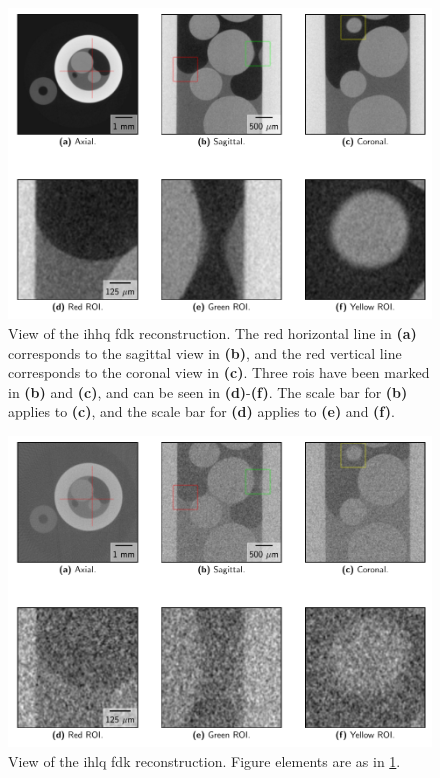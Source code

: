 
\begin{figure}[htbp]
  \centering
  \includegraphics[width=.9\textwidth]{figures/kimroberthq-x475y620s250.pdf}
  \caption[View of IHHQ]{View of the \gls{ihhq} \gls{fdk} reconstruction. The red horizontal line in \textbf{(a)} corresponds to the sagittal view in \textbf{(b)}, and the red vertical line corresponds to the coronal view in \textbf{(c)}. Three \gls{roi}s have been marked in \textbf{(b)} and \textbf{(c)}, and can be seen in \textbf{(d)}-\textbf{(f)}. The scale bar for \textbf{(b)} applies to \textbf{(c)}, and the scale bar for \textbf{(d)} applies to \textbf{(e)} and \textbf{(f)}. }
  \label{fig:sideplothq}
\end{figure}

\begin{figure}[htbp]
  \centering
  \includegraphics[width=.9\textwidth]{figures/kimrobertfdk-x475y620s250.pdf}
  \caption[View of IHLQ FDK]{View of the \gls{ihlq} \gls{fdk} reconstruction. Figure elements are as in \cref{fig:sideplothq}.} 
  \label{fig:sideplotfdk}
\end{figure}

